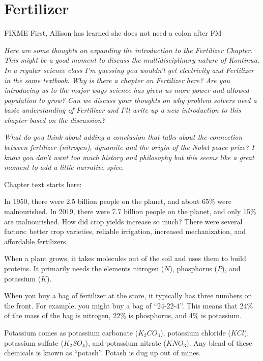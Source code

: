 \chapter{Fertilizer}

FIXME 
First, Allison has learned she does not need a colon after FM

\textit{Here are some thoughts on expanding the introduction to the Fertilizer Chapter. This might be a good moment to discuss the multidisciplinary nature of Kontinua. 
In a regular science class I'm guessing you wouldn't get electricity and Fertilizer in the same textbook. Why is there a chapter on Fertilizer here? Are you introducing us to the major ways science has given us more power and allowed population to grow? Can we discuss your thoughts on why problem solvers need a basic understanding of Fertilizer and I'll write up a new introduction to this chapter based on the discussion?}

\textit{What do you think about adding a conclusion that talks about the connection between fertilizer (nitrogen), dynamite and the origin of the Nobel peace prize? I know you don't want too much history and philosophy but this seems like a great moment to add a little narrative spice}.

Chapter text starts here: 


In 1950, there were 2.5 billion people on the planet, and about 65\%
were malnourished. In 2019, there were 7.7 billion people on the
planet, and only 15\% are malnourished. How did crop yields increase
so much? There were several factors: better crop varieties,
reliable irrigation, increased mechanization, and affordable fertilizers.

When a plant grows, it takes molecules out of the soil and uses them
to build proteins. It primarily needs the elements nitrogen ($N$),
phosphorus ($P$), and potassium ($K$).  

When you buy a bag of fertilizer at the store, it typically has
three numbers on the front.  For example, you might buy a bag of
``24-22-4''.  This means that 24\% of the mass of the bag is nitrogen,
22\% is phosphorus, and 4\% is potassium.

Potassium comes as potassium carbonate ($K_2CO_3$), potassium chloride
($KCl$), potassium sulfate ($K_2 SO_4$), and potassium nitrate
($KNO_3$). Any blend of these chemicals is known as ``potash''. Potash
is dug up out of mines. 

